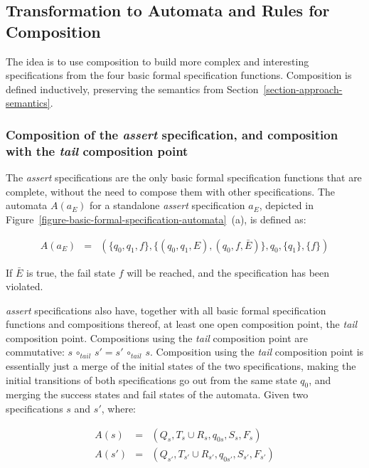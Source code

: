 

\subsection{Transformation to Automata and Rules for Composition}
\label{section-approach-composition}
\lstset{language=Python,numbers=none}

The idea is to use composition to build more complex and interesting
specifications from the four basic formal specification functions. Composition
is defined inductively, preserving the semantics from
Section~\ref{section-approach-semantics}.


\subsubsection{Composition of the \textit{assert} specification, and
composition with the \textit{tail} composition point}

The \textit{assert} specifications are the only basic formal specification
functions that are complete, without the need to compose them with other
specifications. The automata $A(a_E)$ for a standalone \textit{assert}
specification $a_E$, depicted in
Figure~\ref{figure-basic-formal-specification-automata}~(a), is defined as:

\medskip
\[
  \begin{array}{rcl}
    A(a_E) & = & (\{q_0, q_1, f\}, \{(q_0, q_1, E), (q_0, f, \bar{E})\}, q_0, \{q_1\}, \{f\})
  \end{array}
\]
\medskip

If $\bar{E}$ is true, the fail state $f$ will be reached, and the specification
has been violated.

\textit{assert} specifications also have, together with all basic formal
specification functions and compositions thereof, at least one open composition
point, the \textit{tail} composition point. Compositions using the
\textit{tail} composition point are commutative: $s \, \circ_{tail} \, s' = s'
\, \circ_{tail} \, s$. Composition using the \textit{tail} composition point is
essentially just a merge of the initial states of the two specifications,
making the initial transitions of both specifications go out from the same
state $q_0$, and merging the success states and fail states of the automata. Given two
specifications $s$ and $s'$, where:

\medskip
\[
  \begin{array}{rcl}
    A(s) & = & (Q_s, T_s \cup R_s, q_{0s}, S_s, F_s) \\
   A(s') & = & (Q_{s'}, T_{s'} \cup R_{s'}, q_{0s'}, S_{s'}, F_{s'})
  \end{array}
\]
\medskip

